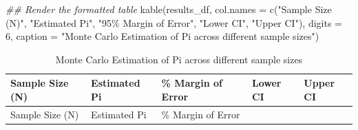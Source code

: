 \documentclass[
  letterpaper,
  DIV=11,
  numbers=noendperiod]{scrreprt}
\newenvironment{Shaded}{\begin{snugshade}}{\end{snugshade}}
\newcommand{\AttributeTok}[1]{\textcolor[rgb]{0.40,0.45,0.13}{#1}}
\newcommand{\DecValTok}[1]{\textcolor[rgb]{0.68,0.00,0.00}{#1}}
\newcommand{\DocumentationTok}[1]{\textcolor[rgb]{0.37,0.37,0.37}{\textit{#1}}}
\newcommand{\FunctionTok}[1]{\textcolor[rgb]{0.28,0.35,0.67}{#1}}
\newcommand{\NormalTok}[1]{\textcolor[rgb]{0.00,0.23,0.31}{#1}}
\newcommand{\StringTok}[1]{\textcolor[rgb]{0.13,0.47,0.30}{#1}}
\begin{document}
\begin{Shaded}
\begin{Highlighting}[]
\DocumentationTok{\#\# Render the formatted table}
\FunctionTok{kable}\NormalTok{(results\_df, }
      \AttributeTok{col.names =} \FunctionTok{c}\NormalTok{(}\StringTok{"Sample Size (N)"}\NormalTok{, }\StringTok{"Estimated Pi"}\NormalTok{, }\StringTok{"95\% Margin of Error"}\NormalTok{, }\StringTok{"Lower CI"}\NormalTok{, }\StringTok{"Upper CI"}\NormalTok{), }
      \AttributeTok{digits =} \DecValTok{6}\NormalTok{, }
      \AttributeTok{caption =} \StringTok{"Monte Carlo Estimation of Pi across different sample sizes"}\NormalTok{)}
\end{Highlighting}
\end{Shaded}

\begin{longtable}[]{@{}
  >{\raggedleft\arraybackslash}p{}
  >{\raggedleft\arraybackslash}p{}
  >{\raggedleft\arraybackslash}p{}
  >{\raggedleft\arraybackslash}p{}
  >{\raggedleft\arraybackslash}p{}@{}}
\caption{Monte Carlo Estimation of Pi across different sample
sizes}\tabularnewline
\toprule\noalign{}
\begin{minipage}[b]{\linewidth}\raggedleft
Sample Size (N)
\end{minipage} & \begin{minipage}[b]{\linewidth}\raggedleft
Estimated Pi
\end{minipage} & \begin{minipage}[b]{\linewidth}\raggedleft
95\% Margin of Error
\end{minipage} & \begin{minipage}[b]{\linewidth}\raggedleft
Lower CI
\end{minipage} & \begin{minipage}[b]{\linewidth}\raggedleft
Upper CI
\end{minipage} \\
\midrule\noalign{}
\endfirsthead
\toprule\noalign{}
\begin{minipage}[b]{\linewidth}\raggedleft
Sample Size (N)
\end{minipage} & \begin{minipage}[b]{\linewidth}\raggedleft
Estimated Pi
\end{minipage} & \begin{minipage}[b]{\linewidth}\raggedleft
95\% Margin of Error
\end{minipage} & \begin{minipage}[b]{\linewidth}\raggedleft

\end{minipage}
\end{longtable}
\end{document}
